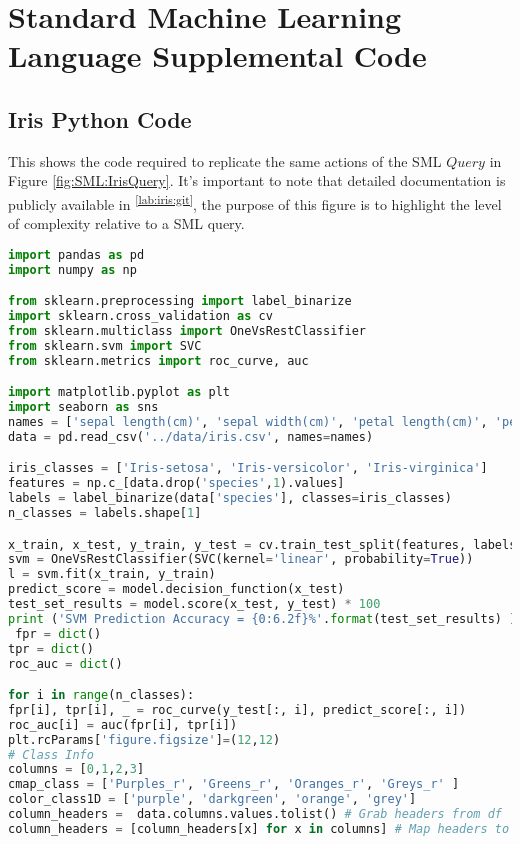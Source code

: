 \chapter{Standard Machine Learning Language Supplemental Code}
\section{Iris Python Code}

This shows the code required to replicate the same actions of the SML \(Query\) in Figure \ref{fig:SML:IrisQuery}. It's important to note that detailed documentation is publicly available in \textsuperscript{\ref{lab:iris:git}}, the purpose of this figure is to highlight the level of complexity relative to a SML query.

\begin{lstlisting}[language=python]
import pandas as pd
import numpy as np

from sklearn.preprocessing import label_binarize
import sklearn.cross_validation as cv
from sklearn.multiclass import OneVsRestClassifier
from sklearn.svm import SVC
from sklearn.metrics import roc_curve, auc

import matplotlib.pyplot as plt
import seaborn as sns
names = ['sepal length(cm)', 'sepal width(cm)', 'petal length(cm)', 'petal width(cm)', 'species']
data = pd.read_csv('../data/iris.csv', names=names)

iris_classes = ['Iris-setosa', 'Iris-versicolor', 'Iris-virginica']
features = np.c_[data.drop('species',1).values]
labels = label_binarize(data['species'], classes=iris_classes)
n_classes = labels.shape[1]

x_train, x_test, y_train, y_test = cv.train_test_split(features, labels, test_size=0.25)
svm = OneVsRestClassifier(SVC(kernel='linear', probability=True))
l = svm.fit(x_train, y_train)
predict_score = model.decision_function(x_test)
test_set_results = model.score(x_test, y_test) * 100
print ('SVM Prediction Accuracy = {0:6.2f}%'.format(test_set_results) )
 fpr = dict()
tpr = dict()
roc_auc = dict()

for i in range(n_classes):
fpr[i], tpr[i], _ = roc_curve(y_test[:, i], predict_score[:, i])
roc_auc[i] = auc(fpr[i], tpr[i])
plt.rcParams['figure.figsize']=(12,12)
# Class Info
columns = [0,1,2,3]
cmap_class = ['Purples_r', 'Greens_r', 'Oranges_r', 'Greys_r' ]
color_class1D = ['purple', 'darkgreen', 'orange', 'grey']
column_headers =  data.columns.values.tolist() # Grab headers from df
column_headers = [column_headers[x] for x in columns] # Map headers to indices selected


\end{lstlisting}
